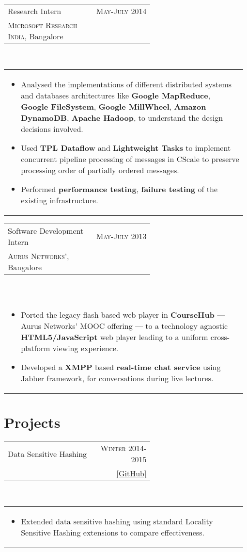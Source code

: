 \documentclass[a4paper]{article} %
\newcommand{\verticalspacing}{-0.25cm}
\newcommand{\bulletspace}{0.7cm}
\newcommand{\projectheadspacing}{6.9cm}
\newcommand{\cproject}[5]{%
    \begin{tabular}{p{0.60\linewidth}r}
        \textcolor{NavyBlue}{\small #2} & \multicolumn{1}{m{ \projectheadspacing{} }}{\raggedleft \small {\textsc{#1}}}\\
        \small {#3} & \small {#4}
    \end{tabular}\\
    \begin{tabular}{p{0.98\linewidth}}
    \vspace{-0.3cm}
        \small{#5}
    \end{tabular}
    \vspace{\verticalspacing{}}
}
\begin{document}
\cproject
      {May-July 2014}
      {Research Intern}
      {\textsc{Microsoft Research India}, Bangalore}
      {}
      {%
          \begin{itemize}[leftmargin=\bulletspace{}]
              \item Analysed the implementations of different distributed systems and databases architectures like
                  \textbf{Google MapReduce}, \textbf{Google FileSystem}, \textbf{Google MillWheel},
                  \textbf{Amazon DynamoDB}, \textbf{Apache Hadoop}, to understand the design decisions involved.
              \item Used \textbf{TPL Dataflow} and \textbf{Lightweight Tasks} to implement concurrent pipeline
                  processing of messages in CScale to preserve processing order of partially ordered messages.
              \item Performed \textbf{performance testing}, \textbf{failure testing} of the existing infrastructure.
          \end{itemize}
     }

\cproject
    {May-July 2013}
    {Software Development Intern}
    {\textsc{Aurus Networks'}, Bangalore}
    {}
    {%
        \begin{itemize}[leftmargin=\bulletspace{}]
            \item Ported the legacy flash based web player in \textbf{CourseHub} --- Aurus Networks'
                MOOC offering --- to a technology agnostic \textbf{HTML5/JavaScript} web player leading
                to a uniform cross-platform viewing experience.
            \item Developed a \textbf{XMPP} based \textbf{real-time chat service} using Jabber framework,
                for conversations during live lectures.
        \end{itemize}
    }

\vspace{-0.35cm}
\section{Projects}

\cproject
    {Winter 2014-2015}
    {Data Sensitive Hashing}
    {\textsc{\raggedright Indexing and Searching in Databases}, Professor Arnab Bhattacharya}
    {\href{https://github.com/srijanshetty/data-sensitive-hashing} {[GitHub]}}
    {%
        \begin{itemize}[leftmargin=\bulletspace{}]
            \item Extended data sensitive hashing using standard Locality Sensitive Hashing extensions
             to compare effectiveness.
        \end{itemize}
    }
\end{document}
